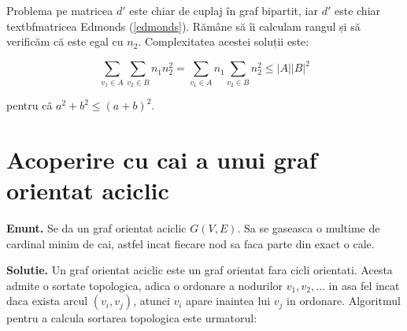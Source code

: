 Problema pe matricea $d'$ este chiar de cuplaj în graf bipartit, iar $d'$ este chiar textbf{matricea Edmonds} (\ref{edmonds}). Rămâne să îi calculam
rangul și să verificăm că este egal cu $n_{2}$. Complexitatea acestei soluții este:

\begin{equation}
  \displaystyle\sum\limits_{v_{1} \in A} \displaystyle\sum\limits_{v_{2} \in B} n_{1}n_{2}^{2} = \displaystyle\sum\limits_{v_{1} \in A} n_{1} \displaystyle\sum\limits_{v_{2} \in B} n_{2}^{2} \leq |A||B|^{2}
\end{equation}

\noindent pentru că $a^{2} + b^{2} \leq (a + b)^{2}$.

\pagebreak

\section{Acoperire cu cai a unui graf orientat aciclic}

\noindent \textbf{Enunt.} Se da un graf orientat aciclic $G(V, E)$. Sa se gaseasca o multime de cardinal minim de cai, astfel incat
fiecare nod sa faca parte din exact o cale.

\noindent \textbf{Solutie.} Un graf orientat aciclic este un graf orientat fara cicli orientati. Acesta admite o sortate topologica,
adica o ordonare a nodurilor $v_{1}, v_{2}, \ldots$ in asa fel incat daca exista arcul $(v_{i}, v_{j})$, atunci $v_{i}$ apare inaintea
lui $v_{j}$ in ordonare. Algoritmul pentru a calcula sortarea topologica este urmatorul:

\begin{algorithm}[H]
  \DontPrintSemicolon
  \;
\end{algorithm}

\begin{algorithm}[H]
  \DontPrintSemicolon
  \;
\end{algorithm}

\pagebreak

